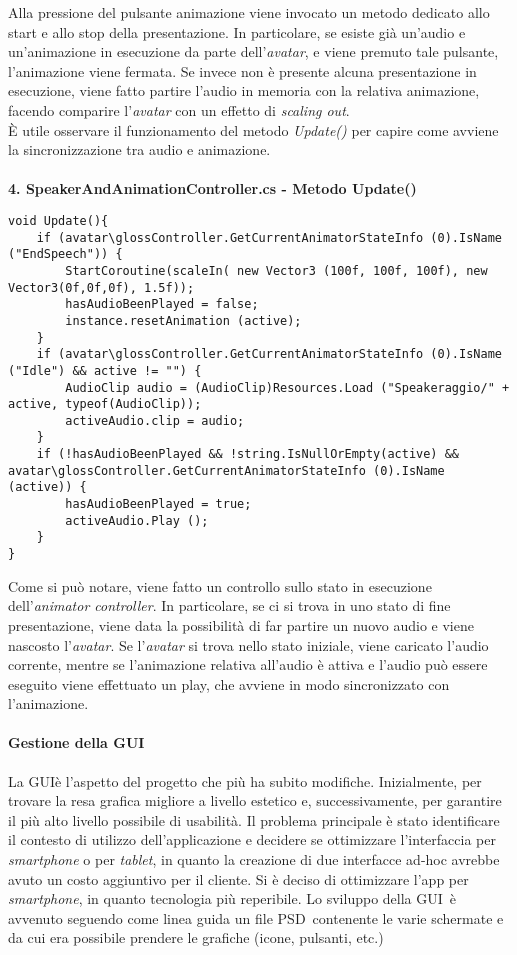 Alla pressione del pulsante animazione viene invocato un metodo dedicato allo start e allo stop della presentazione. In particolare, se esiste gi\`a un'audio e un'animazione in esecuzione da parte dell'\textit{avatar\gloss}, e viene premuto tale pulsante, l'animazione viene fermata. Se invece  non \`e presente alcuna presentazione in esecuzione, viene fatto partire l'audio in memoria con la relativa animazione, facendo comparire l'\textit{avatar\gloss} con un effetto di \textit{scaling out}.\\
\`E utile osservare il funzionamento del metodo \textit{Update()} per capire come avviene la sincronizzazione tra audio e animazione.
\\\\
\textbf{4. SpeakerAndAnimationController.cs - Metodo Update()}
\begin{lstlisting}
void Update(){
	if (avatar\glossController.GetCurrentAnimatorStateInfo (0).IsName ("EndSpeech")) {
		StartCoroutine(scaleIn( new Vector3 (100f, 100f, 100f), new Vector3(0f,0f,0f), 1.5f));
		hasAudioBeenPlayed = false;
		instance.resetAnimation (active);
	}
	if (avatar\glossController.GetCurrentAnimatorStateInfo (0).IsName ("Idle") && active != "") {
		AudioClip audio = (AudioClip)Resources.Load ("Speakeraggio/" + active, typeof(AudioClip));
		activeAudio.clip = audio;
	}
	if (!hasAudioBeenPlayed && !string.IsNullOrEmpty(active) && avatar\glossController.GetCurrentAnimatorStateInfo (0).IsName (active)) {
		hasAudioBeenPlayed = true;
		activeAudio.Play ();
	}
}
\end{lstlisting}
\noindent
Come si pu\`o notare, viene fatto un controllo sullo stato in esecuzione dell'\textit{animator controller}. In particolare, se ci si trova in uno stato di fine presentazione, viene data la possibilit\`a di far partire un nuovo audio e viene nascosto l'\textit{avatar\gloss}.
Se l'\textit{avatar\gloss} si trova nello stato iniziale, viene caricato l'audio corrente, mentre se l'animazione relativa all'audio \`e attiva e l'audio pu\`o essere eseguito viene effettuato un play, che avviene in modo sincronizzato con l'animazione.\\

\paragraph{Gestione della GUI\gloss}
La GUI\gloss \`e l'aspetto del progetto che pi\`u ha subito modifiche. Inizialmente, per trovare la resa grafica migliore a livello estetico e, successivamente, per garantire il pi\`u alto livello possibile di usabilit\`a. Il problema principale \`e stato identificare il contesto di utilizzo dell'applicazione e decidere se ottimizzare l'interfaccia per \textit{smartphone} o per \textit{tablet}, in quanto la creazione di due interfacce ad-hoc avrebbe avuto un costo aggiuntivo per il cliente. Si \`e deciso di ottimizzare l'app per \textit{smartphone}, in quanto tecnologia pi\`u reperibile. Lo sviluppo della GUI\gloss\ \`e avvenuto seguendo come linea guida un file PSD\gloss\ contenente le varie schermate e da cui era possibile prendere le grafiche (icone, pulsanti, etc.)


